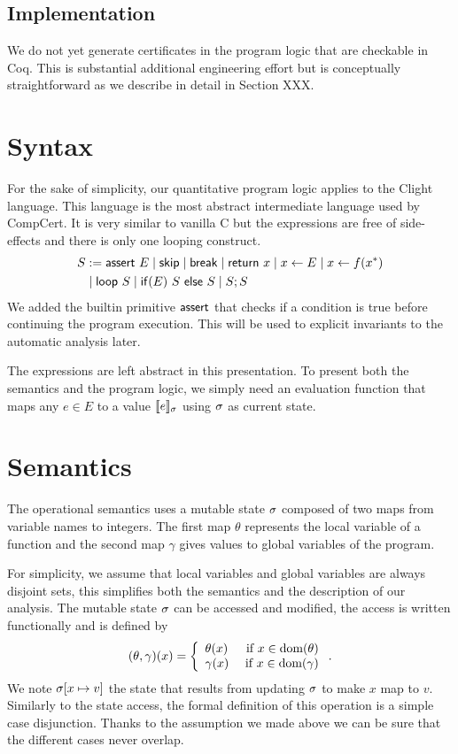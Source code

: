 \documentclass[nocopyrightspace,preprint]{sigplanconf}
\begin{document}
\subsection{Implementation}

We do not yet generate certificates in the program logic that are
checkable in Coq.  This is substantial additional engineering effort
but is conceptually straightforward as we describe in detail in
Section XXX.


\section{Syntax}

For the sake of simplicity, our quantitative program logic
applies to the Clight language.  This language is the most
abstract intermediate language used by CompCert.  It is very
similar to vanilla C but the expressions are free of
side-effects and there is only one looping construct.
%
\begin{align*}
S &:= \mathsf{assert}~E
\mid \mathsf{skip}
\mid \mathsf{break}
\mid \mathsf{return}~x
\mid x \gets E
\mid x \gets f(x^*)
\\
& \mid \mathsf{loop}~S
\mid \mathsf{if}(E)~S~\mathsf{else}~S
\mid S;S
\end{align*}
%
We added the builtin primitive $\mathsf{assert}$ that checks
if a condition is true before continuing the program
execution.  This will be used to explicit invariants to the
automatic analysis later.

The expressions are left abstract in this presentation.  To
present both the semantics and the program logic, we simply
need an evaluation function that maps any $e \in E$ to
a value $\llbracket e \rrbracket_{\sigma}$ using $\sigma$ as current
state.

\section{Semantics}

The operational semantics uses a mutable state $\sigma$
composed of two maps from variable names to integers. The
first map $\theta$ represents the local variable of a
function and the second map $\gamma$ gives values to global
variables of the program.

For simplicity, we assume that local variables and global
variables are always disjoint sets, this simplifies both
the semantics and the description of our analysis.  The
mutable state $\sigma$ can be accessed and modified, the
access is written functionally and is defined by
$$
(\theta, \gamma)(x) =
\left\{
\begin{array}{lr}
\theta(x) & \mbox{ if } x \in  \text{dom}(\theta) \\
\gamma(x) & \mbox{ if } x \in  \text{dom}(\gamma)
\end{array}
\right..
$$
We note $\sigma[x \mapsto v]$ the state that results from
updating $\sigma$ to make $x$ map to $v$.  Similarly to
the state access, the formal definition of this operation
is a simple case disjunction.  Thanks to the assumption we
made above we can be sure that the different cases never
overlap.
\end{document}
